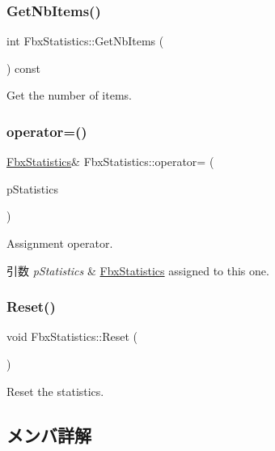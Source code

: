 \subsubsection{\texorpdfstring{Get\+Nb\+Items()}{GetNbItems()}}
{\footnotesize\ttfamily int Fbx\+Statistics\+::\+Get\+Nb\+Items (\begin{DoxyParamCaption}{ }\end{DoxyParamCaption}) const}



Get the number of items. 

\mbox{\label{class_fbx_statistics_a176871e5e6bf03a71a2ae7f4dd277403}} 
\subsubsection{\texorpdfstring{operator=()}{operator=()}}
{\footnotesize\ttfamily \hyperlink{class_fbx_statistics}{Fbx\+Statistics}\& Fbx\+Statistics\+::operator= (\begin{DoxyParamCaption}\item[{const \hyperlink{class_fbx_statistics}{Fbx\+Statistics} \&}]{p\+Statistics }\end{DoxyParamCaption})}

Assignment operator. 
\begin{DoxyParams}{引数}
{\em p\+Statistics} & \hyperlink{class_fbx_statistics}{Fbx\+Statistics} assigned to this one. \\
\hline
\end{DoxyParams}
\mbox{\label{class_fbx_statistics_ad0cf2f0dafc61cb5c99b8ad63d86f0c7}} 
\subsubsection{\texorpdfstring{Reset()}{Reset()}}
{\footnotesize\ttfamily void Fbx\+Statistics\+::\+Reset (\begin{DoxyParamCaption}{ }\end{DoxyParamCaption})}



Reset the statistics. 



\subsection{メンバ詳解}
\mbox{\label{class_fbx_statistics_a9754af27b7b5d98fb085595e633370e8}} 
